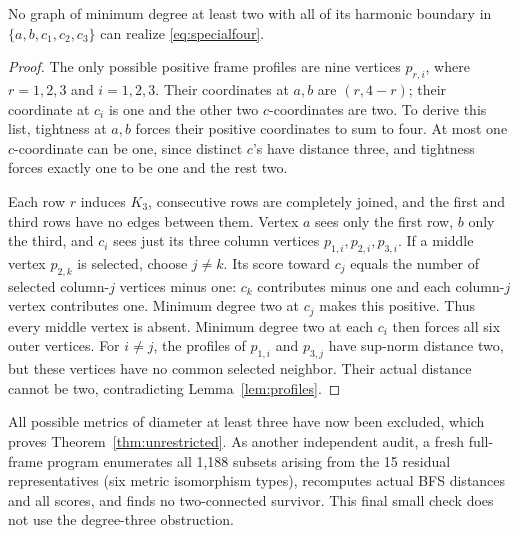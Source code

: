 \begin{lemma}\label{lem:specialfour}
No graph of minimum degree at least two with all of its harmonic boundary
in $\{a,b,c_1,c_2,c_3\}$ can realize \eqref{eq:specialfour}.
\end{lemma}
\begin{proof}
The only possible positive frame profiles are nine vertices
$p_{r,i}$, where $r=1,2,3$ and $i=1,2,3$. Their coordinates at $a,b$
are $(r,4-r)$; their coordinate at $c_i$ is one and the other two
$c$-coordinates are two. To derive this list, tightness at $a,b$ forces
their positive coordinates to sum to four. At most one $c$-coordinate
can be one, since distinct $c$'s have distance three, and tightness
forces exactly one to be one and the rest two.

Each row $r$ induces $K_3$, consecutive rows are completely joined, and
the first and third rows have no edges between them. Vertex $a$ sees
only the first row, $b$ only the third, and $c_i$ sees just its three
column vertices $p_{1,i},p_{2,i},p_{3,i}$.
If a middle vertex $p_{2,k}$ is selected, choose $j\ne k$.
Its score toward $c_j$ equals the number of selected column-$j$ vertices
minus one: $c_k$ contributes minus one and each column-$j$ vertex
contributes one. Minimum degree two at $c_j$ makes this positive.
Thus every middle vertex is absent. Minimum degree two at each $c_i$
then forces all six outer vertices. For $i\ne j$, the profiles of
$p_{1,i}$ and $p_{3,j}$ have sup-norm distance two, but these vertices
have no common selected neighbor. Their actual distance cannot be two,
contradicting Lemma~\ref{lem:profiles}.
\end{proof}

All possible metrics of diameter at least three have now been excluded,
which proves Theorem~\ref{thm:unrestricted}. As another independent audit,
a fresh full-frame program enumerates all 1,188 subsets arising from the
15 residual representatives (six metric isomorphism types), recomputes
actual BFS distances and all scores, and finds no two-connected survivor.
This final small check does not use the degree-three obstruction.
